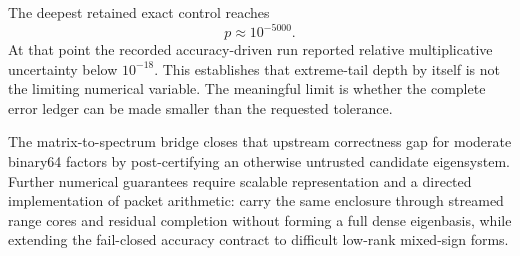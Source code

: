 The deepest retained exact control reaches
\[
p\approx10^{-5000}.
\]
At that point the recorded accuracy-driven run reported relative multiplicative
uncertainty below \(10^{-18}\).  This establishes that extreme-tail depth by
itself is not the limiting numerical variable. The meaningful limit is whether
the complete error ledger can be made smaller than the requested tolerance.

The matrix-to-spectrum bridge closes that upstream correctness gap for
moderate binary64 factors by post-certifying an otherwise untrusted candidate
eigensystem.  Further numerical guarantees require scalable
representation and a directed implementation of packet arithmetic: carry the same enclosure through streamed range cores and
residual completion without forming a full dense eigenbasis, while extending
the fail-closed accuracy contract to difficult low-rank mixed-sign forms.




